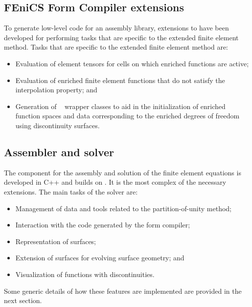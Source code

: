 \subsection{FEniCS Form Compiler extensions}

To generate low-level code for an assembly library, extensions to \ffc{}
have been developed for performing tasks that are specific to the extended
finite element method.  Tasks that are specific to the extended finite
element method are:
%
\begin{itemize}
  \item Evaluation of element tensors for cells on which enriched
  functions are active;

  \item Evaluation of enriched finite element functions that do not
  satisfy the interpolation property; and

  \item Generation of \dolfin~ wrapper classes to aid in the
  initialization of enriched function spaces and data corresponding to
  the enriched degrees of freedom using discontinuity surfaces.
\end{itemize}
\subsection{Assembler and solver}
%
The component for the assembly and solution of the finite element
equations is developed in C++ and builds on \dolfin{}. It is the most
complex of the necessary extensions. The main tasks of the solver are:
%
\begin{itemize}
  \item Management of data and tools related to the partition-of-unity
  method;

  \item Interaction with the code generated by the form compiler;

  \item Representation of surfaces;

  \item Extension of surfaces for evolving surface geometry; and

  \item Visualization of functions with discontinuities.
\end{itemize}
%
Some generic details of how these features are implemented are provided
in the next section.


